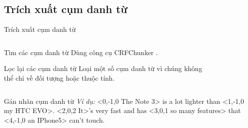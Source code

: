 \documentclass[9pt,xcolor=table,hyperref=unicode]{beamer}
\begin{document}
	\subsection{Trích xuất cụm danh từ}
	\begin{frame}{Trích xuất cụm danh từ}		
		\begin{columns}[t]
			\begin{column}{0.4\textwidth}
			   	\begin{block}{Tìm các cụm danh từ}
	   				Dùng công cụ CRFChunker \footnotemark.
				\end{block}
				\begin{block}{Lọc lại các cụm danh từ}
			   		Loại một số cụm danh từ vì chúng không thể chỉ về đối tượng hoặc thuộc tính.				
				\end{block}
			\end{column}
			\begin{column}{0.6\textwidth}  %
			 	\begin{figure}[H]
					\LARGE 
					\centering				
					\resizebox{65mm}{!}{}	
				\end{figure}
			\end{column}
		\end{columns}
		\begin{columns}[t]
			\begin{column}{\textwidth}
			   	\begin{block}{Gán nhãn cụm danh từ}					
					\textit{Ví dụ:} <0,-1,0 The Note 3> is a lot lighter than <1,-1,0 my HTC EVO>. <2,0,2 It>'s very fast and has <3,0,1 so many features> that <4,-1,0 an IPhone5> can't touch. 
				\end{block}					
			\end{column}			
		\end{columns}
	\end{frame}
\end{document}
